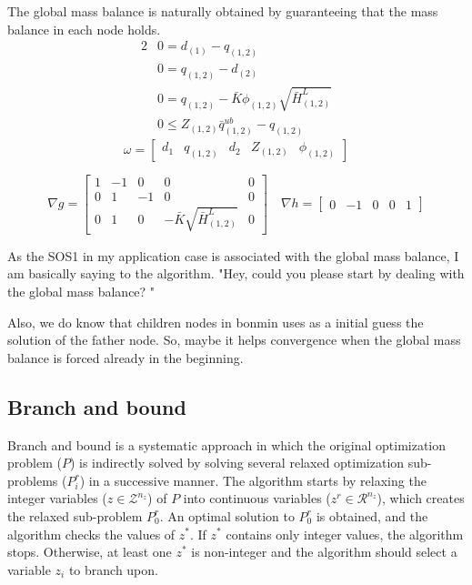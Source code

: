 The global mass balance is naturally obtained by guaranteeing that the mass balance in each node holds. 
\begin{alignat}{2}
    & 0 = d_{(1)} - q_{(1,2)} \\
    & 0 = q_{(1,2)} - d_{(2)} \\
    & 0 = q_{(1,2)} - \bar{K} \phi_{(1,2)} \sqrt{\bar{H}^L_{(1,2)}} \\
    & 0 \leq Z_{(1,2)} \bar{q}_{(1,2)}^{ub} - q_{(1,2)}
\end{alignat}
\begin{equation}
    \omega = \left[\begin{array}{ccccccccccc}
        d_1 & q_{(1,2)} & d_2 & Z_{(1,2)} & \phi_{(1,2)}
    \end{array}\right]
\end{equation}

\begin{equation}
    \nabla g = \left[\begin{array}{ccccccccccc}
        1 &-1 & 0& 0                                  & 0\\
        0 & 1 &-1& 0                                  & 0\\
        0 & 1 & 0& - \bar{K} \sqrt{\bar{H}^L_{(1,2)}} & 0
    \end{array}\right] \quad \nabla h = \left[\begin{array}{ccccccccccc}
        0 &-1 & 0& 0 & 1
    \end{array}\right]
\end{equation}


As the SOS1 in my application case is associated with the global mass balance, I am basically saying to the algorithm. "Hey, could you please start by dealing with the global mass balance? "

Also, we do know that children nodes in bonmin uses as a initial guess the solution of the father node. So, maybe it helps convergence when the global mass balance is forced already in the beginning.

\subsection{Branch and bound}

Branch and bound is a systematic approach in which the original optimization problem ($P$) is indirectly solved by solving several   relaxed optimization sub-problems ($P_i^r$) in a successive manner. The algorithm starts by relaxing the integer variables ($z \in \mathcal{Z}^{n_z}$) of $P$ into continuous variables ($z^{r} \in \mathcal{R}^{n_z}$), which creates the relaxed sub-problem $P_0^r$. An optimal solution to $P_0^r$ is obtained, and the algorithm checks the values of $z^*$. If $z^*$ contains only integer values, the algorithm stops. Otherwise, at least one $z^*$ is non-integer and the algorithm should select a variable $z_i$ to branch upon.



